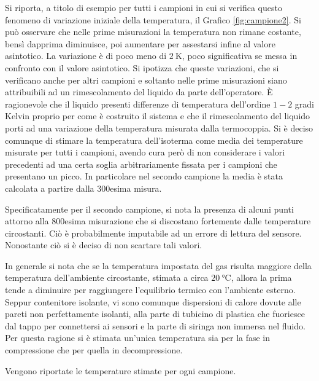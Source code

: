 \documentclass[a4paper,11pt,oneside]{article}
\begin{document}
Si riporta, a titolo di esempio per tutti i campioni in cui si verifica questo fenomeno di variazione iniziale della temperatura, il Grafico \ref{fig:campione2}. Si può osservare che nelle prime misurazioni la temperatura non rimane costante, bensì dapprima diminuisce, poi aumentare per assestarsi infine al valore asintotico. La variazione è di poco meno di $\SI{2}{\kelvin}$, poco significativa se messa in confronto con il valore asintotico. %
Si ipotizza che queste variazioni, che si verificano anche per altri campioni e soltanto nelle prime misurazioni siano attribuibili ad un rimescolamento del liquido da parte dell'operatore. È ragionevole che il liquido presenti differenze di temperatura dell'ordine $1-2$ gradi Kelvin proprio per come è costruito il sistema e che il rimescolamento del liquido porti ad una variazione della temperatura misurata dalla termocoppia. 
Si è deciso comunque di stimare la temperatura dell'isoterma come media dei temperature misurate per tutti i campioni, avendo cura però di non considerare i valori precedenti ad una certa soglia arbitrariamente fissata per i campioni che presentano un picco. In particolare nel secondo campione la media è stata calcolata a partire dalla 300esima misura.

Specificatamente per il secondo campione, si nota la presenza di alcuni punti attorno alla 800esima misurazione che si discostano fortemente dalle temperature circostanti. Ciò è probabilmente imputabile ad un errore di lettura del sensore. Nonostante ciò si è deciso di non scartare tali valori.

In generale si nota che se la temperatura impostata del gas risulta maggiore della temperatura dell'ambiente circostante, stimata a circa $\SI{20}{\celsius}$, allora la prima tende a diminuire per raggiungere l'equilibrio termico con l'ambiente esterno. Seppur contenitore isolante, vi sono comunque dispersioni di calore dovute alle pareti non perfettamente isolanti, alla parte di tubicino di plastica che fuoriesce dal tappo per connettersi ai sensori e la parte di siringa non immersa nel fluido. Per questa ragione si è stimata un'unica temperatura sia per la fase in compressione che per quella in decompressione.


Vengono riportate le temperature stimate per ogni campione.
\end{document}
